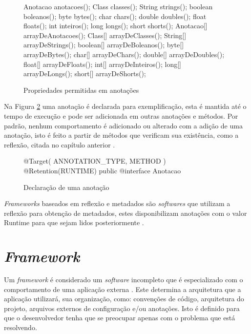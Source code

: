 \begin{figure}[H]
    \centering
    \caption{Propriedades permitidas em anotações}
    \begin{java}
Anotacao anotacoes();
Class classes();
String strings();
boolean boleanos();
byte bytes();
char chars();
double doubles();
float floats();
int inteiros();
long longs();	
short shorts();
Anotacao[] arrayDeAnotacoes();
Class[] arrayDeClasses();
String[] arrayDeStrings();
boolean[] arrayDeBoleanos();
byte[] arrayDeBytes();
char[] arrayDeChars();
double[] arrayDeDoubles();
float[] arrayDeFloats();
int[] arrayDeInteiros();
long[] arrayDeLongs();	
short[] arrayDeShorts();
    \end{java}
    \label{fig:propriedades-anotacoes}
\end{figure}

\par Na Figura \ref{fig:declaracao-anotacao} uma anotação é declarada para exemplificação, esta é mantida até o tempo de execução e pode ser adicionada em outras anotações e métodos. Por padrão, nenhum comportamento é adicionado ou alterado com a adição de uma anotação, isto é feito a partir de métodos que verificam sua existência, como a reflexão, citada no capítulo anterior \cite{bloch2004jsr}. 

\begin{figure}[H]
    \centering
    \caption{Declaração de uma anotação}
    \begin{java}
@Target({ ANNOTATION_TYPE, METHOD })
@Retention(RUNTIME)
public @interface Anotacao {
}
    \end{java}
    \label{fig:declaracao-anotacao}
\end{figure}

\textit{Frameworks} baseados em reflexão e metadados são \textit{softwares} que utilizam a reflexão para obtenção de metadados, estes disponibilizam anotações com o valor Runtime para que sejam lidos posteriormente \cite{guerra2009pattern}.

\section{\textit{Framework}}

\par Um \textit{framework} é considerado um \textit{software} incompleto que é especializado com o comportamento de uma aplicação externa \cite{johnson1988designing}. Este determina a arquitetura que a aplicação utilizará, sua organização, como: convenções de código, arquitetura do projeto, arquivos externos de configuração e/ou anotações. Isto é definido para que o desenvolvedor tenha que se preocupar apenas com o problema que está resolvendo. 

